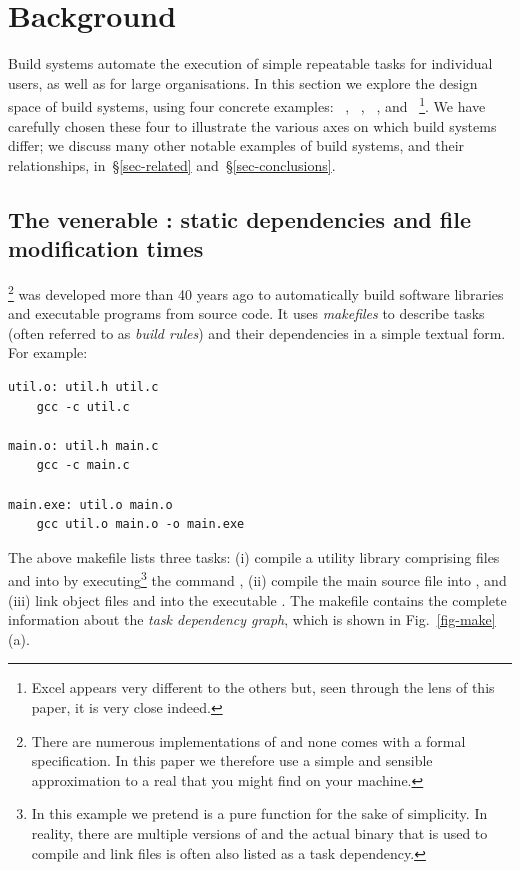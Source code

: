 \clearpage
\section{Background}\label{sec-background}

Build systems automate the execution of simple repeatable tasks for individual
users, as well as for large organisations. In this section we explore the design
space of build systems, using four concrete examples:
\Make~\cite{feldman1979make}, \Shake~\cite{mitchell2012shake},
\Bazel~\cite{bazel}, and \Excel~\cite{advanced_excel}\footnote{Excel appears
very different to the others but, seen through the lens of this paper, it is
very close indeed.}.
We have carefully chosen these four to illustrate the various axes on which build systems
differ; we discuss many other notable examples
of build systems, and their relationships,
in~\S\ref{sec-related} and~\S\ref{sec-conclusions}.

\subsection{The venerable \Make: static dependencies and file modification times}
\label{sec-background-make}

\Make\footnote{There are numerous implementations of \Make and none comes with a
formal specification. In this paper we therefore use a simple and sensible
approximation to a real \Make that you might find on your machine.} was developed
more than 40 years ago to automatically build software libraries and executable
programs from source code. It uses \emph{makefiles} to describe tasks (often
referred to as \emph{build rules}) and their dependencies in a simple textual form.
For example:

\vspace{1mm}
\begin{verbatim}
util.o: util.h util.c
    gcc -c util.c

main.o: util.h main.c
    gcc -c main.c

main.exe: util.o main.o
    gcc util.o main.o -o main.exe
\end{verbatim}
\vspace{1mm}

\noindent
The above makefile lists three tasks: (i) compile a utility library comprising
files  and  into  by
executing\footnote{In this example we pretend  is a pure function for the
sake of simplicity. In reality, there are multiple versions of  and the
actual binary that is used to compile and link files is often also listed as a task
dependency.} the command , (ii) compile the main source file
 into , and (iii) link object files  and
 into the executable . The makefile contains the
complete information about the \emph{task dependency graph}, which is shown in
Fig.~\ref{fig-make}(a).

